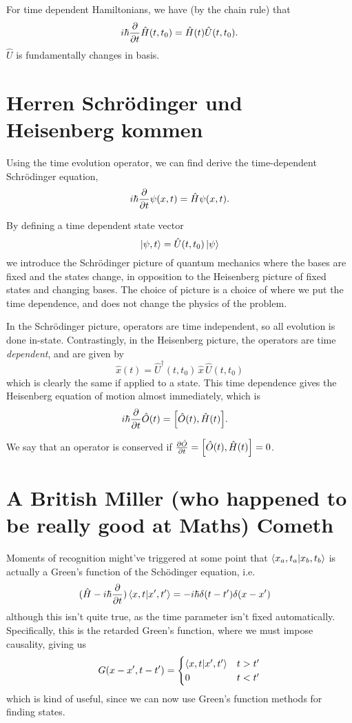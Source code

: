 \documentclass[]{revision-notes}
\begin{document}
For time dependent Hamiltonians, we have (by the chain rule) that
\[ i\hbar \pdv{t}\hat{H}(t, t_0) = \hat{H}(t)\hat{U}(t, t_0). \]
\(\hat{U}\) is fundamentally changes in basis.

\section{Herren Schr\"odinger und Heisenberg kommen}
Using the time evolution operator, we can find derive the time-dependent Schr\"odinger equation, \[ i\hbar\pdv{t}\psi(x, t) = \hat{H}\psi(x, t) .\]

By defining a time dependent state vector \[ \ket{\psi, t} = \hat{U}(t, t_0) \ket{\psi} \] we introduce the Schr\"odinger picture of quantum mechanics where the bases are fixed and the states change, in opposition to the Heisenberg picture of fixed states and changing bases.
The choice of picture is a choice of where we put the time dependence, and does not change the physics of the problem.

In the Schr\"odinger picture, operators are time independent, so all evolution is done in-state. Contrastingly, in the Heisenberg picture, the operators are time \emph{dependent}, and are given by \[ \hat{x}(t) = \hat{U}^\dagger(t, t_0)\, \hat{x}\, \hat{U}(t, t_0) \] which is clearly the same if applied to a state. This time dependence gives the Heisenberg equation of motion almost immediately, which is
\begin{align*}
  i\hbar \pdv{t}\hat{O}(t) &= \commutator{\hat{O}(t)}{\hat{H}(t)}.
\end{align*}

We say that an operator is conserved if \(\pdv{\hat{O}}{t} = \commutator{\hat{O}(t)}{\hat{H}(t)} = 0 \).

\section{A British Miller (who happened to be really good at Maths) Cometh}
Moments of recognition might've triggered at some point that \( \braket{x_a, t_a}{x_b, t_b} \) is actually a Green's function of the Sch\"odinger equation, i.e.~
\begin{align*}
  (\hat{H} - i\hbar\pdv{t}) \braket{x, t}{x^\prime, t^\prime} &= -i\hbar \delta(t- t^\prime) \delta(x - x^\prime)
\end{align*}
although this isn't quite true, as the time parameter isn't fixed automatically.
Specifically, this is the retarded Green's function, where we must impose causality, giving us
\begin{equation*}
  G(x-x^\prime, t - t^\prime) =
  \begin{cases}
    \braket{x, t}{x^\prime, t^\prime} & t > t^\prime \\
    0 & t < t^\prime
  \end{cases}
\end{equation*}
which is kind of useful, since we can now use Green's function methods for finding states.
\end{document}
